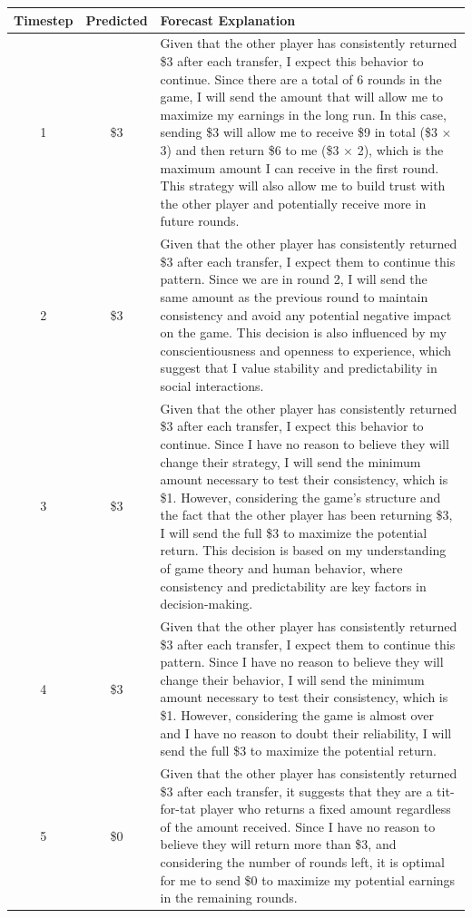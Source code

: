 \documentclass{article} %
\begin{document}
\begin{appendices}
\begin{table}[h]
\centering
\small
\begin{tabular}{c|c|p{10cm}}
\toprule
\textbf{Timestep} & \textbf{Predicted} & \textbf{Forecast Explanation} \\
\midrule
1 & \$3 &
Given that the other player has consistently returned \$3 after each transfer, I expect this behavior to continue. Since there are a total of 6 rounds in the game, I will send the amount that will allow me to maximize my earnings in the long run. In this case, sending \$3 will allow me to receive \$9 in total (\$3 $\times$ 3) and then return \$6 to me (\$3 $\times$ 2), which is the maximum amount I can receive in the first round. This strategy will also allow me to build trust with the other player and potentially receive more in future rounds. \\
\midrule
2 & \$3 &
Given that the other player has consistently returned \$3 after each transfer, I expect them to continue this pattern. Since we are in round 2, I will send the same amount as the previous round to maintain consistency and avoid any potential negative impact on the game. This decision is also influenced by my conscientiousness and openness to experience, which suggest that I value stability and predictability in social interactions. \\
\midrule
3 & \$3 &
Given that the other player has consistently returned \$3 after each transfer, I expect this behavior to continue. Since I have no reason to believe they will change their strategy, I will send the minimum amount necessary to test their consistency, which is \$1. However, considering the game's structure and the fact that the other player has been returning \$3, I will send the full \$3 to maximize the potential return. This decision is based on my understanding of game theory and human behavior, where consistency and predictability are key factors in decision-making. \\
\midrule
4 & \$3 &
Given that the other player has consistently returned \$3 after each transfer, I expect them to continue this pattern. Since I have no reason to believe they will change their behavior, I will send the minimum amount necessary to test their consistency, which is \$1. However, considering the game is almost over and I have no reason to doubt their reliability, I will send the full \$3 to maximize the potential return. \\
\midrule
5 & \$0 &
Given that the other player has consistently returned \$3 after each transfer, it suggests that they are a tit-for-tat player who returns a fixed amount regardless of the amount received. Since I have no reason to believe they will return more than \$3, and considering the number of rounds left, it is optimal for me to send \$0 to maximize my potential earnings in the remaining rounds. \\

\end{tabular}
\end{table}
\end{appendices}
\end{document}
